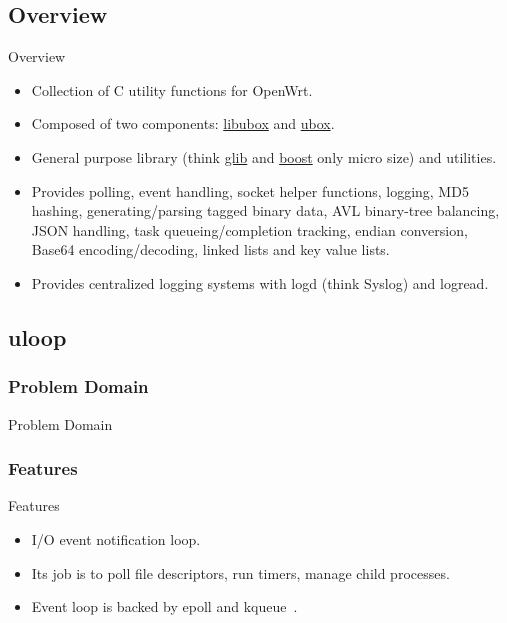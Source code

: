 \subsection{Overview}
\begin{frame}{Overview}
    \begin{itemize}[<+-|alert@+>]
        \item Collection of C utility functions for OpenWrt.
        \item Composed of two components: \href{https://git.openwrt.org/project/libubox.git}{libubox} and \href{https://git.openwrt.org/project/ubox.git}{ubox}.
        \item General purpose library (think \href{https://wiki.gnome.org/Projects/GLib}{glib} and \href{https://www.boost.org/}{boost} only micro size) and utilities.
        \item Provides polling, event handling, socket helper functions, logging, MD5 hashing, generating/parsing tagged binary data, AVL binary-tree balancing, JSON handling, task queueing/completion tracking, endian conversion, Base64 encoding/decoding, linked lists and key value lists.
        \item Provides centralized logging systems with logd (think Syslog) and logread.
    \end{itemize}
\end{frame}

\subsection{uloop}

\subsubsection{Problem Domain}
\begin{frame}{Problem Domain}
\end{frame}

\subsubsection{Features}
\begin{frame}{Features}
    \begin{itemize}[<+-|alert@+>]
        \item I/O event notification loop.
        \item Its job is to poll file descriptors, run timers, manage child processes.
        \item Event loop is backed by epoll and kqueue~\cite{starch-linux-programming-interface}.
    \end{itemize}
\end{frame}

